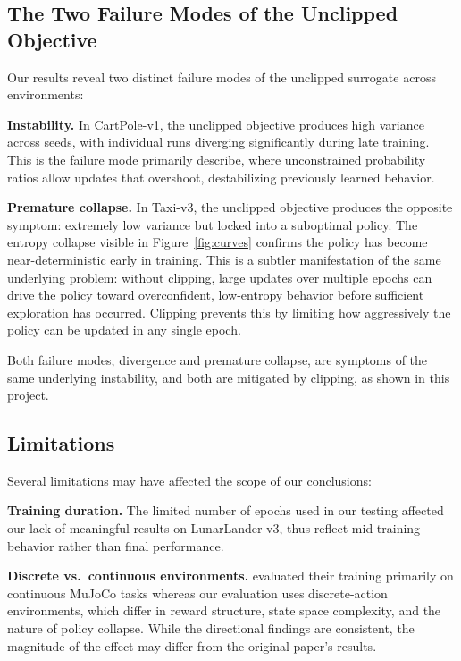 \documentclass{article}
\begin{document}
\subsection{The Two Failure Modes of the Unclipped Objective}

Our results reveal two distinct failure modes of the unclipped surrogate across environments:

\textbf{Instability.} In CartPole-v1, the unclipped objective produces high variance across seeds, with individual runs diverging significantly during late training. This is the failure mode \citet{schulman2017ppo} primarily describe, where unconstrained probability ratios allow updates that overshoot, destabilizing previously learned behavior.

\textbf{Premature collapse.} In Taxi-v3, the unclipped objective produces the opposite symptom: extremely low variance but locked into a suboptimal policy. The entropy collapse visible in Figure~\ref{fig:curves} confirms the policy has become near-deterministic early in training. This is a subtler manifestation of the same underlying problem: without clipping, large updates over multiple epochs can drive the policy toward overconfident, low-entropy behavior before sufficient exploration has occurred. Clipping prevents this by limiting how aggressively the policy can be updated in any single epoch.

Both failure modes, divergence and premature collapse, are symptoms of the same underlying instability, and both are mitigated by clipping, as shown in this project.

\subsection{Limitations}

Several limitations may have affected the scope of our conclusions:

\textbf{Training duration.} The limited number of epochs used in our testing affected our lack of meaningful results on LunarLander-v3, thus reflect mid-training behavior rather than final performance.

\textbf{Discrete vs.\ continuous environments.} \citet{schulman2017ppo} evaluated their training primarily on continuous MuJoCo tasks whereas our evaluation uses discrete-action environments, which differ in reward structure, state space complexity, and the nature of policy collapse. While the directional findings are consistent, the magnitude of the effect may differ from the original paper's results.
\end{document}

